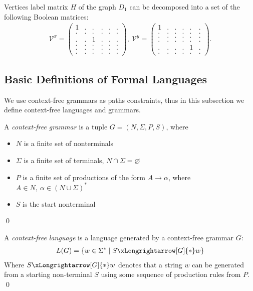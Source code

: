 Vertices label matrix $H$ of the graph $D_1$ can be decomposed into a set of the following Boolean matrices:
{
    \renewcommand{\arraystretch}{0.7}
    \setlength\arraycolsep{2pt}
\begin{align*}
\mathcal{V}^x =
\begin{pmatrix}
    1 & . & . & . & . & . \\
    . & . & . & . & . & . \\
    . & . & 1 & . & . & . \\
    . & . & . & . & . & . \\
    . & . & . & . & . & . \\
    . & . & . & . & . & .
\end{pmatrix},~
\mathcal{V}^y =
\begin{pmatrix}
    1 & . & . & . & . & . \\
    . & . & . & . & . & . \\
    . & . & . & . & . & . \\
    . & . & . & . & . & . \\
    . & . & . & . & 1 & . \\
    . & . & . & . & . & .
\end{pmatrix}.
\end{align*}
}

\subsection{Basic Definitions of Formal Languages}
We use context-free grammars as paths constraints, thus in this subsection we define context-free languages and grammars.

\begin{definition}A \emph{context-free grammar} is a tuple $G=(N, \Sigma, P, S)$, where
\begin{itemize}
    \item $N$ is a finite set of nonterminals
    \item $\Sigma$ is a finite set of terminals, $N \cap \Sigma = \varnothing$
    \item $P$ is a finite set of productions of the form $A \to \alpha$, where $A \in N,\ \alpha \in (N \cup \Sigma)^*$
    \item $S$ is the start nonterminal
\end{itemize} \qed
\end{definition}

\begin{definition} A \emph{context-free language} is a language generated by a context-free grammar $G$:
\begin{align*}
     L(G) = \{w \in \Sigma^* \mid S \xLongrightarrow[G]{*} w \}
\end{align*}
Where $S \xLongrightarrow[G]{*} w$  denotes that a string $w$ can be generated from a starting non-terminal $S$ using some sequence of production rules from $P$. \qed
\end{definition}

